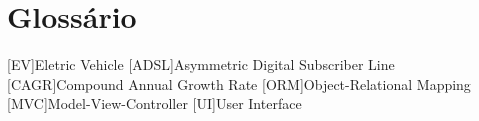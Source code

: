 \chapter{Glossário}

\footnotesize
\SingleSpacing

\begin{multicols}{2}
\begin{acronym}[AAAAAA]

	[EV]{Eletric Vehicle}
	[ADSL]{Asymmetric Digital Subscriber Line}
	[CAGR]{Compound Annual Growth Rate}
	[ORM]{Object-Relational Mapping}
	[MVC]{Model-View-Controller}
	[UI]{User Interface}
	

\end{acronym}
\end{multicols}


